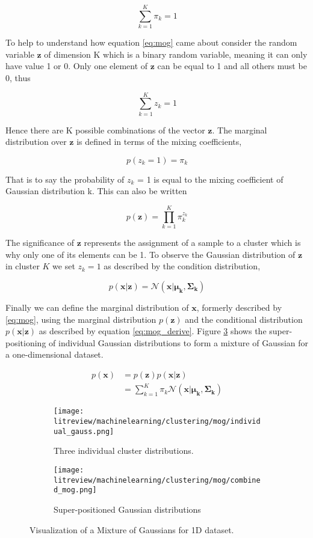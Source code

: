 \[\sum_{k=1}^K\pi_k = 1\]

To help to understand how equation \ref{eq:mog} came about consider the random variable $\boldsymbol{z}$ of dimension K which is a binary random variable, meaning it can only have value 1 or 0. Only one element of $\boldsymbol{z}$ can be equal to 1 and all others must be 0, thus

\[\sum_{k=1}^Kz_k = 1\]

Hence there are K possible combinations of the vector $\boldsymbol{z}$. The marginal distribution over $\boldsymbol{z}$ is defined in terms of the mixing coefficients, 

\[p(z_k = 1) = \pi_k\]

That is to say the probability of $z_k$ = 1 is equal to the mixing coefficient of Gaussian distribution k. This can also be written

\[p(\boldsymbol{z}) = \prod^K_{k=1}\pi^{z_k}_k\]

The significance of $\boldsymbol{z}$ represents the assignment of a sample to a cluster which is why only one of its elements can be 1. To observe the Gaussian distribution of $\boldsymbol{z}$ in cluster $K$ we set $z_k = 1$ as described by the condition distribution,

\[p(\bm{x}|\boldsymbol{z}) = \mathcal{N}(\boldsymbol{x}|\boldsymbol{\mu_k}, \boldsymbol{\Sigma_k}) \]

Finally we can define the marginal distribution of $\boldsymbol{x}$, formerly described by \ref{eq:mog}, using the marginal distribution $p(\boldsymbol{z})$ and the conditional distribution $p(\bm{x}|\bm{z})$ as described by equation \ref{eq:mog_derive}. Figure \ref{fig:mog_compare} shows the super-positioning of individual Gaussian distributions to form a mixture of Gaussian for a one-dimensional dataset.

\begin{align}
	p(\bm{x}) 	&= p(\bm{z})p(\bm{x}|\bm{z})\\
				&= \sum^{K}_{k = 1}\pi_k \mathcal{N}(\boldsymbol{x}|\boldsymbol{\mu_k}, \boldsymbol{\Sigma_k})
\label{eq:mog_derive}
\end{align}


\begin{figure}[htbp]
    \centering
     \begin{subfigure}[b]{0.45\textwidth}
        \texttt{[image: litreview/machinelearning/clustering/mog/individual\_gauss.png]}
	\captionsetup{format = hang}
        \caption{Three individual cluster distributions.}
        \label{fig:mog_singles}
    \end{subfigure} 
    \begin{subfigure}[b]{0.45\textwidth}
        \texttt{[image: litreview/machinelearning/clustering/mog/combined\_mog.png]}	
	\captionsetup{format = hang}
        \caption{Super-positioned Gaussian distributions}
        \label{fig:mog_combined}
    \end{subfigure}
    \captionsetup{format = hang}
    \caption{Visualization of a Mixture of Gaussians for 1D dataset.}
    \label{fig:mog_compare}
\end{figure}

